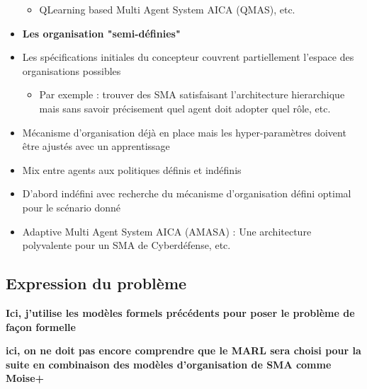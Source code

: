 \documentclass{article}
\begin{document}
\begin{itemize}
\begin{itemize}
              \item QLearning based Multi Agent System AICA (QMAS), etc.
          \end{itemize}
    \item \textbf{Les organisation "semi-définies"}
    \item Les spécifications initiales du concepteur couvrent partiellement l'espace des organisations possibles
          \begin{itemize}
              \item Par exemple : trouver des SMA satisfaisant l'architecture hierarchique mais sans savoir précisement quel agent doit adopter quel rôle, etc.
          \end{itemize}
    \item Mécanisme d’organisation déjà en place mais les hyper-paramètres doivent être ajustés avec un apprentissage
    \item Mix entre agents aux politiques définis et indéfinis
    \item D’abord indéfini avec recherche du mécanisme d’organisation défini optimal pour le scénario donné
    \item Adaptive Multi Agent System AICA (AMASA) : Une architecture polyvalente pour un SMA de Cyberdéfense, etc.
\end{itemize}

\subsection{Expression du problème}
\textbf{Ici, j'utilise les modèles formels précédents pour poser le problème de façon formelle}

\textbf{ici, on ne doit pas encore comprendre que le MARL sera choisi pour la suite en combinaison des modèles d'organisation de SMA comme Moise+}
\end{document}
